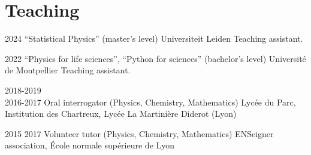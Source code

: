 \documentclass[a4paper]{cvtemplate_en} %
\begin{document}

\section{Teaching}

\begin{cvbody}

\cvitem
	{2024}
	{}
	{``Statistical Physics'' (master's level)}
	{Universiteit Leiden \vspace{-5pt}}
	{}{}{}
	{}
	{Teaching assistant.\vspace{5pt}}

\cvitem
	{2022}
	{}
	{``Physics for life sciences'', ``Python for sciences'' (bachelor's level)}
	{Université de Montpellier }
	{}{}{}
    {}
	{Teaching assistant.\vspace{5pt}}

\cvitem
	{2018-2019\\ \mbox{}\hfill 2016-2017}
	{}
	{Oral interrogator (Physics, Chemistry, Mathematics)}
	{Lyc\'ee du Parc, Institution des Chartreux, Lyc\'ee La Martinière Diderot (Lyon) }
	{}{}{}
	{}
	{\vspace{5pt}
	}


\cvitem
	{2015}
	{2017}
	{Volunteer tutor (Physics, Chemistry, Mathematics)}
	{ENSeigner association, \'Ecole normale sup\'erieure de Lyon }
	{}{}{}
	{}
	{\vspace{5pt}
	}

\end{cvbody}
\end{document}
